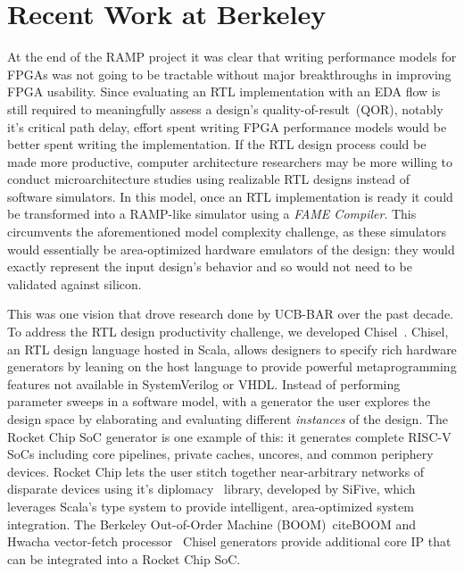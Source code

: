 \section{Recent Work at Berkeley}

At the end of the RAMP project it was clear that writing performance models for
FPGAs was not going to be tractable without major breakthroughs in improving
FPGA usability. Since evaluating an RTL implementation with an EDA flow is still
required to meaningfully assess a design's quality-of-result~(QOR), notably it's critical path
delay, effort spent writing FPGA performance models would be better spent
writing the implementation. If the RTL design process could be made more productive,
computer architecture researchers may be more willing to conduct
microarchitecture studies using realizable RTL designs instead of software
simulators. In this model, once an RTL implementation is ready it could be
transformed into a RAMP-like simulator using a \emph{FAME Compiler}. This circumvents the aforementioned model complexity challenge,
as these simulators would essentially be area-optimized hardware emulators of the design:
they would exactly represent the input design's behavior and so would not need
to be validated against silicon.

This was one vision that drove research done by UCB-BAR over the past decade.
To address the RTL design productivity challenge, we developed
Chisel~\cite{Chisel}. Chisel, an RTL design language hosted in Scala, allows
designers to specify rich hardware generators by leaning on the host language to provide
powerful metaprogramming features not available in SystemVerilog or VHDL.
Instead of performing parameter sweeps in a software model, with a generator
the user explores the design space by elaborating and evaluating different
\emph{instances} of the design. The Rocket Chip SoC generator\cite{RocketChip} is one example of this: it generates complete RISC-V SoCs including
core pipelines, private caches, uncores, and common periphery devices. Rocket
Chip lets the user stitch together near-arbitrary networks of disparate devices
using it's diplomacy~\cite{Diplomacy} library, developed by SiFive, which leverages Scala's type
system to provide intelligent, area-optimized system integration. The
Berkeley Out-of-Order Machine (BOOM)~cite{BOOM} and Hwacha vector-fetch
processor~\cite{Hwacha} Chisel generators provide additional core IP that can be
integrated into a Rocket Chip SoC.

